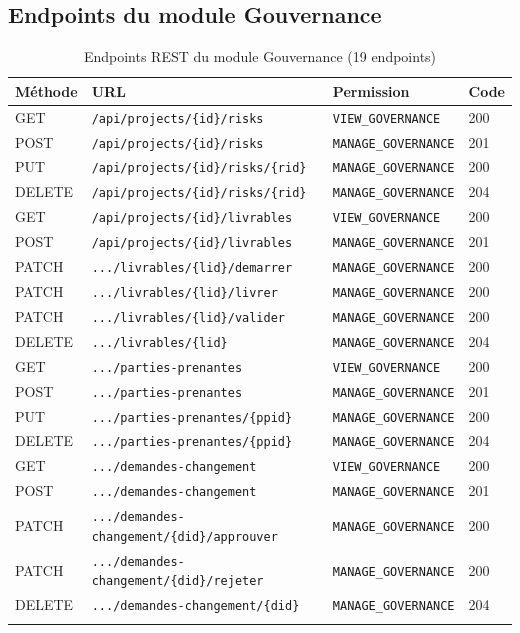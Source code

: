 \subsection{Endpoints du module Gouvernance}

\begin{longtable}{|m{1.8cm}|m{7.5cm}|m{3.5cm}|m{1.5cm}|}
\hline
\textbf{Méthode} & \textbf{URL} & \textbf{Permission} & \textbf{Code} \\
\hline
\endhead
\endfoot
\endlastfoot
\hline
GET & \texttt{/api/projects/\{id\}/risks} & \texttt{VIEW\_GOVERNANCE} & 200 \\
\hline
POST & \texttt{/api/projects/\{id\}/risks} & \texttt{MANAGE\_GOVERNANCE} & 201 \\
\hline
PUT & \texttt{/api/projects/\{id\}/risks/\{rid\}} & \texttt{MANAGE\_GOVERNANCE} & 200 \\
\hline
DELETE & \texttt{/api/projects/\{id\}/risks/\{rid\}} & \texttt{MANAGE\_GOVERNANCE} & 204 \\
\hline
GET & \texttt{/api/projects/\{id\}/livrables} & \texttt{VIEW\_GOVERNANCE} & 200 \\
\hline
POST & \texttt{/api/projects/\{id\}/livrables} & \texttt{MANAGE\_GOVERNANCE} & 201 \\
\hline
PATCH & \texttt{.../livrables/\{lid\}/demarrer} & \texttt{MANAGE\_GOVERNANCE} & 200 \\
\hline
PATCH & \texttt{.../livrables/\{lid\}/livrer} & \texttt{MANAGE\_GOVERNANCE} & 200 \\
\hline
PATCH & \texttt{.../livrables/\{lid\}/valider} & \texttt{MANAGE\_GOVERNANCE} & 200 \\
\hline
DELETE & \texttt{.../livrables/\{lid\}} & \texttt{MANAGE\_GOVERNANCE} & 204 \\
\hline
GET & \texttt{.../parties-prenantes} & \texttt{VIEW\_GOVERNANCE} & 200 \\
\hline
POST & \texttt{.../parties-prenantes} & \texttt{MANAGE\_GOVERNANCE} & 201 \\
\hline
PUT & \texttt{.../parties-prenantes/\{ppid\}} & \texttt{MANAGE\_GOVERNANCE} & 200 \\
\hline
DELETE & \texttt{.../parties-prenantes/\{ppid\}} & \texttt{MANAGE\_GOVERNANCE} & 204 \\
\hline
GET & \texttt{.../demandes-changement} & \texttt{VIEW\_GOVERNANCE} & 200 \\
\hline
POST & \texttt{.../demandes-changement} & \texttt{MANAGE\_GOVERNANCE} & 201 \\
\hline
PATCH & \texttt{.../demandes-changement/\{did\}/approuver} & \texttt{MANAGE\_GOVERNANCE} & 200 \\
\hline
PATCH & \texttt{.../demandes-changement/\{did\}/rejeter} & \texttt{MANAGE\_GOVERNANCE} & 200 \\
\hline
DELETE & \texttt{.../demandes-changement/\{did\}} & \texttt{MANAGE\_GOVERNANCE} & 204 \\
\hline
\caption{Endpoints REST du module Gouvernance (19 endpoints)}
\label{tab:gov-api}
\end{longtable}

